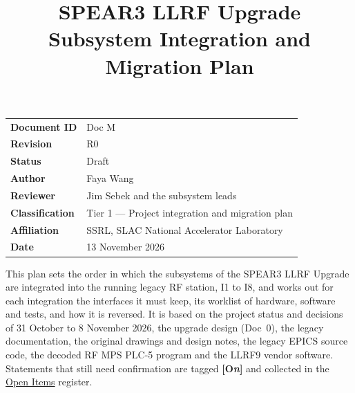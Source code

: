 \documentclass[letterpaper,11pt]{article}
\title{\vspace{-1.4cm}\bfseries SPEAR3 LLRF Upgrade\\[2mm]
       \Large Subsystem Integration and Migration Plan}
\author{}
\date{}
\newcommand{\openitemlegend}{\textcolor{cPlc}{\bfseries\scriptsize[O\textit{n}]}}
\begin{document}
\maketitle
\thispagestyle{plain}

\begin{center}
\begin{minipage}{0.86\linewidth}\small
\begin{tabular}{@{}ll@{}}
\textbf{Document ID}    & Doc M \\
\textbf{Revision}       & R0 \\
\textbf{Status}         & Draft \\
\textbf{Author}         & Faya Wang \\
\textbf{Reviewer}       & Jim Sebek and the subsystem leads \\
\textbf{Classification} & Tier 1 --- Project integration and migration plan \\
\textbf{Affiliation}    & SSRL, SLAC National Accelerator Laboratory \\
\textbf{Date}           & 13 November 2026 \\
\end{tabular}
\end{minipage}
\end{center}

\vspace{4mm}
\begin{keynote}
This plan sets the order in which the subsystems of the SPEAR3 LLRF Upgrade are
integrated into the running legacy RF station, I1 to I8, and works out for each
integration the interfaces it must keep, its worklist of hardware, software and tests,
and how it is reversed. It is based on the project status and decisions of
31 October to 8 November 2026, the upgrade design (Doc~0), the legacy documentation,
the original drawings and design notes, the legacy EPICS source code, the decoded
RF MPS PLC-5 program and the LLRF9 vendor software. Statements
that still need confirmation are tagged \openitemlegend{} and collected in the
\hyperref[sec:open-items]{Open Items} register.
\end{keynote}

\clearpage
\tableofcontents
\bigskip
\listoffigures
\clearpage


\end{document}
